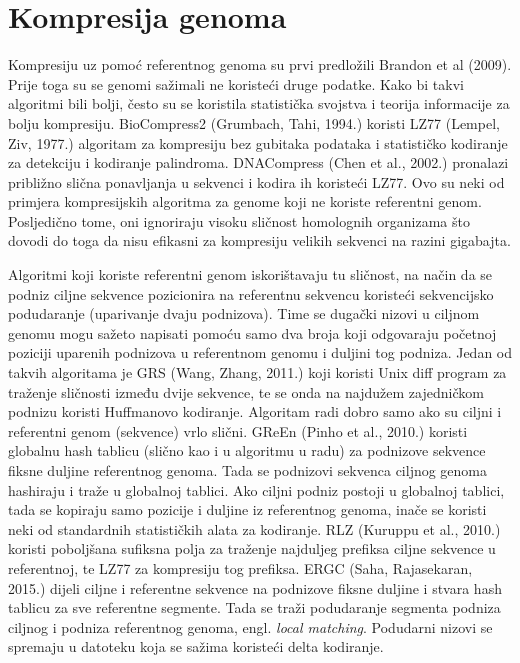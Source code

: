 \documentclass[times, utf8, diplomski]{fer}
\begin{document}
\chapter{Kompresija genoma}
Kompresiju uz pomoć referentnog genoma su prvi predložili Brandon et al (2009). Prije toga su se genomi sažimali ne koristeći druge podatke. Kako bi takvi algoritmi bili bolji, često su se koristila statistička svojstva i teorija informacije za bolju kompresiju. BioCompress2 (Grumbach, Tahi, 1994.) koristi LZ77 (Lempel, Ziv, 1977.) algoritam za kompresiju bez gubitaka podataka i statističko kodiranje za detekciju i kodiranje palindroma. DNACompress (Chen et al., 2002.) pronalazi približno slična ponavljanja u sekvenci i kodira ih koristeći LZ77. Ovo su neki od primjera kompresijskih algoritma za genome koji ne koriste referentni genom. Posljedično tome, oni ignoriraju visoku sličnost homolognih organizama što dovodi do toga da nisu efikasni za kompresiju velikih sekvenci na razini gigabajta.

Algoritmi koji koriste referentni genom iskorištavaju tu sličnost, na način da se podniz ciljne sekvence pozicionira na referentnu sekvencu koristeći sekvencijsko podudaranje (uparivanje dvaju podnizova). Time se dugački nizovi u ciljnom genomu mogu sažeto napisati pomoću samo dva broja koji odgovaraju početnoj poziciji uparenih podnizova u referentnom genomu i duljini tog podniza. Jedan od takvih algoritama je GRS (Wang, Zhang, 2011.) koji koristi Unix diff program za traženje sličnosti između dvije sekvence, te se onda na najdužem zajedničkom podnizu koristi Huffmanovo kodiranje. Algoritam radi dobro samo ako su ciljni i referentni genom (sekvence) vrlo slični. GReEn (Pinho et al., 2010.) koristi globalnu hash tablicu (slično kao i u algoritmu u radu) za podnizove sekvence fiksne duljine referentnog genoma. Tada se podnizovi sekvenca ciljnog genoma hashiraju i traže u globalnoj tablici. Ako ciljni podniz postoji u globalnoj tablici, tada se kopiraju samo pozicije i duljine iz referentnog genoma, inače se koristi neki od standardnih statističkih alata za kodiranje. RLZ (Kuruppu et al., 2010.) koristi poboljšana sufiksna polja za traženje najduljeg prefiksa ciljne sekvence u referentnoj, te LZ77 za kompresiju tog prefiksa. ERGC (Saha, Rajasekaran, 2015.) dijeli ciljne i referentne sekvence na podnizove fiksne duljine i stvara hash tablicu za sve referentne segmente. Tada se traži podudaranje segmenta podniza ciljnog i podniza referentnog genoma, engl. \textit{local matching}. Podudarni nizovi se spremaju u datoteku koja se sažima koristeći delta kodiranje.
\end{document}
